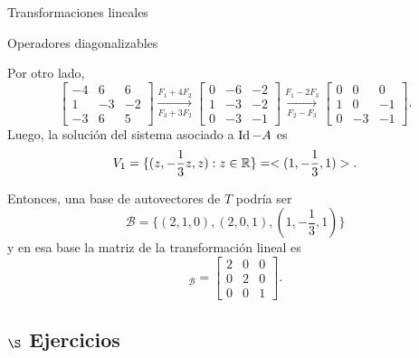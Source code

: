 \begin{chapter}{Transformaciones lineales}
\begin{section}{Operadores diagonalizables}
\begin{ejemplo*}
            Por otro lado, 
            \begin{equation*}
            \begin{bmatrix}-4 &6 &6\\ 1& -3& -2\\-3 &6& 5 	\end{bmatrix}
            \underset{F_3+3F_2}{\stackrel{F_1+4 F_2}{\longrightarrow}} 
            \begin{bmatrix}0 &-6 &-2\\ 1& -3& -2\\0 &-3& -1 	\end{bmatrix}
            \underset{F_2-F_3}{\stackrel{F_1-2 F_3}{\longrightarrow}}
            \begin{bmatrix}0 &0 &0\\ 1& 0& -1\\0 &-3& -1 	\end{bmatrix}.
            \end{equation*}
            Luego,  la solución del sistema asociado a  $\operatorname{Id}-A$ es 
            $$
            V_1 = \{(z,-\frac13z,z): z \in \mathbb R\} = <(1,-\frac13,1)>.
            $$
            
            Entonces, una base de autovectores de $T$ podría ser
            $$
            \mathcal{B} = \{(2,1,0),(2,0,1),(1,-\frac13,1) \}
            $$
            y en esa base la matriz de la transformación lineal es
            \begin{equation*}
            [T]_{\mathcal{B}} = \begin{bmatrix}2 &0 &0\\ 0& 2& 0\\0 &0& 1 	\end{bmatrix}.
            \end{equation*}
        \end{ejemplo*}
    
        \subsection*{$\S$ Ejercicios}


\end{section}
\end{chapter}
